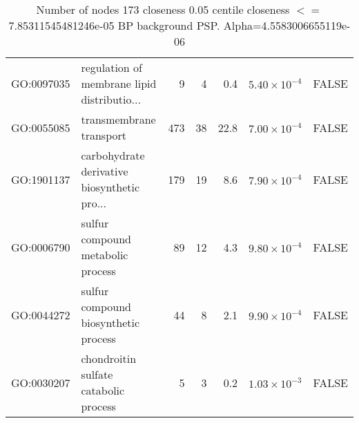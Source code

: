 \begin{table}[ht]
\begin{adjustbox}{max width=\textwidth}
\begin{tabular}{llrrrrl}
  GO:0097035 & regulation of membrane lipid distributio... & 9 & 4 & 0.4 & $5.40 \times 10^{-4}$ & FALSE \\ 
  GO:0055085 & transmembrane transport & 473 & 38 & 22.8 & $7.00 \times 10^{-4}$ & FALSE \\ 
  GO:1901137 & carbohydrate derivative biosynthetic pro... & 179 & 19 & 8.6 & $7.90 \times 10^{-4}$ & FALSE \\ 
  GO:0006790 & sulfur compound metabolic process & 89 & 12 & 4.3 & $9.80 \times 10^{-4}$ & FALSE \\ 
  GO:0044272 & sulfur compound biosynthetic process & 44 & 8 & 2.1 & $9.90 \times 10^{-4}$ & FALSE \\ 
  GO:0030207 & chondroitin sulfate catabolic process & 5 & 3 & 0.2 & $1.03 \times 10^{-3}$ & FALSE \\ 
   \hline
\end{tabular}
\end{adjustbox}
\caption{Number of nodes 173 closeness 0.05 centile  closeness $<=$ 7.85311545481246e-05 BP background PSP. Alpha=4.5583006655119e-06} 
\label{tab:Number of nodes 173 closeness 0.05 centile  closeness $<=$ 7.85311545481246e-05 BP background PSP. Alpha=4.5583006655119e-06}
\end{table}



